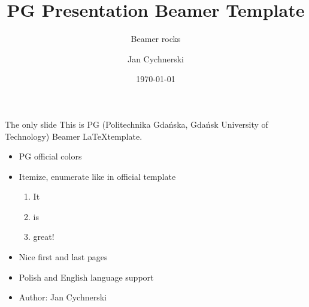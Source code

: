 \documentclass{beamer}
\title[PG Presentation]{PG Presentation Beamer Template}
\subtitle{Beamer rocks}
\author{Jan Cychnerski}
\date{\today}
\begin{document}
\pgtitleframe



\begin{frame}{The only slide}
	This is PG (Politechnika Gdańska, Gdańsk University of Technology) Beamer \LaTeX template.

	\pause

	\begin{itemize}[<+->]
	\item PG official colors
	\item Itemize, enumerate like in official template
		\begin{enumerate}
		\item It
		\item is
		\item great!
		\end{enumerate}
	\item Nice first and last pages
	\item Polish and English language support
	\item Author: \alert<+->{Jan Cychnerski}
	\end{itemize}
\end{frame}


\pglastframe


\end{document}
